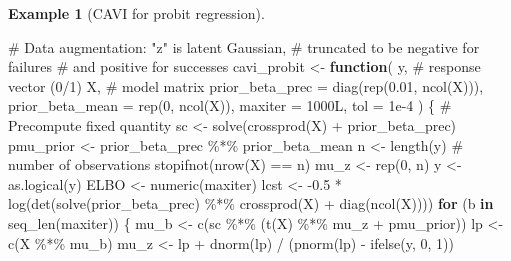 \documentclass[
  11pt,
  letterpaper,
]{scrbook}
\newenvironment{Shaded}{\begin{snugshade}}{\end{snugshade}}
\newcommand{\AttributeTok}[1]{\textcolor[rgb]{0.40,0.45,0.13}{#1}}
\newcommand{\CommentTok}[1]{\textcolor[rgb]{0.37,0.37,0.37}{#1}}
\newcommand{\ControlFlowTok}[1]{\textcolor[rgb]{0.00,0.23,0.31}{\textbf{#1}}}
\newcommand{\DecValTok}[1]{\textcolor[rgb]{0.68,0.00,0.00}{#1}}
\newcommand{\FloatTok}[1]{\textcolor[rgb]{0.68,0.00,0.00}{#1}}
\newcommand{\FunctionTok}[1]{\textcolor[rgb]{0.28,0.35,0.67}{#1}}
\newcommand{\NormalTok}[1]{\textcolor[rgb]{0.00,0.23,0.31}{#1}}
\newcommand{\OtherTok}[1]{\textcolor[rgb]{0.00,0.23,0.31}{#1}}
\newcommand{\SpecialCharTok}[1]{\textcolor[rgb]{0.37,0.37,0.37}{#1}}
\theoremstyle{definition}
\newtheorem{example}{Example}[chapter]
\theoremstyle{plain}
\theoremstyle{plain}
\theoremstyle{plain}
\theoremstyle{definition}
\theoremstyle{definition}
\theoremstyle{plain}
\theoremstyle{plain}
\theoremstyle{remark}
\begin{document}
\begin{example}[CAVI for probit
regression]
\begin{Shaded}
\begin{Highlighting}[]
\CommentTok{\# Data augmentation: "z" is latent Gaussian, }
\CommentTok{\# truncated to be negative for failures }
\CommentTok{\# and positive for successes}
\NormalTok{cavi\_probit }\OtherTok{\textless{}{-}} \ControlFlowTok{function}\NormalTok{(}
\NormalTok{  y, }\CommentTok{\# response vector (0/1)}
\NormalTok{  X, }\CommentTok{\# model matrix}
  \AttributeTok{prior\_beta\_prec =} \FunctionTok{diag}\NormalTok{(}\FunctionTok{rep}\NormalTok{(}\FloatTok{0.01}\NormalTok{, }\FunctionTok{ncol}\NormalTok{(X))),}
  \AttributeTok{prior\_beta\_mean =} \FunctionTok{rep}\NormalTok{(}\DecValTok{0}\NormalTok{, }\FunctionTok{ncol}\NormalTok{(X)),}
  \AttributeTok{maxiter =} \DecValTok{1000}\NormalTok{L,}
  \AttributeTok{tol =} \FloatTok{1e{-}4}
\NormalTok{) \{}
  \CommentTok{\# Precompute fixed quantity}
\NormalTok{  sc }\OtherTok{\textless{}{-}} \FunctionTok{solve}\NormalTok{(}\FunctionTok{crossprod}\NormalTok{(X) }\SpecialCharTok{+}\NormalTok{ prior\_beta\_prec)}
\NormalTok{  pmu\_prior }\OtherTok{\textless{}{-}}\NormalTok{ prior\_beta\_prec }\SpecialCharTok{\%*\%}\NormalTok{ prior\_beta\_mean}
\NormalTok{  n }\OtherTok{\textless{}{-}} \FunctionTok{length}\NormalTok{(y) }\CommentTok{\# number of observations}
  \FunctionTok{stopifnot}\NormalTok{(}\FunctionTok{nrow}\NormalTok{(X) }\SpecialCharTok{==}\NormalTok{ n)}
\NormalTok{  mu\_z }\OtherTok{\textless{}{-}} \FunctionTok{rep}\NormalTok{(}\DecValTok{0}\NormalTok{, n)}
\NormalTok{  y }\OtherTok{\textless{}{-}} \FunctionTok{as.logical}\NormalTok{(y)}
\NormalTok{  ELBO }\OtherTok{\textless{}{-}} \FunctionTok{numeric}\NormalTok{(maxiter)}
\NormalTok{  lcst }\OtherTok{\textless{}{-}} \SpecialCharTok{{-}}\FloatTok{0.5} \SpecialCharTok{*}
    \FunctionTok{log}\NormalTok{(}\FunctionTok{det}\NormalTok{(}\FunctionTok{solve}\NormalTok{(prior\_beta\_prec) }\SpecialCharTok{\%*\%} \FunctionTok{crossprod}\NormalTok{(X) }\SpecialCharTok{+} \FunctionTok{diag}\NormalTok{(}\FunctionTok{ncol}\NormalTok{(X))))}
  \ControlFlowTok{for}\NormalTok{ (b }\ControlFlowTok{in} \FunctionTok{seq\_len}\NormalTok{(maxiter)) \{}
\NormalTok{    mu\_b }\OtherTok{\textless{}{-}} \FunctionTok{c}\NormalTok{(sc }\SpecialCharTok{\%*\%}\NormalTok{ (}\FunctionTok{t}\NormalTok{(X) }\SpecialCharTok{\%*\%}\NormalTok{ mu\_z }\SpecialCharTok{+}\NormalTok{ pmu\_prior))}
\NormalTok{    lp }\OtherTok{\textless{}{-}} \FunctionTok{c}\NormalTok{(X }\SpecialCharTok{\%*\%}\NormalTok{ mu\_b)}
\NormalTok{    mu\_z }\OtherTok{\textless{}{-}}\NormalTok{ lp }\SpecialCharTok{+} \FunctionTok{dnorm}\NormalTok{(lp) }\SpecialCharTok{/}\NormalTok{ (}\FunctionTok{pnorm}\NormalTok{(lp) }\SpecialCharTok{{-}} \FunctionTok{ifelse}\NormalTok{(y, }\DecValTok{0}\NormalTok{, }\DecValTok{1}\NormalTok{))}

\end{Highlighting}
\end{Shaded}
\end{example}
\end{document}
